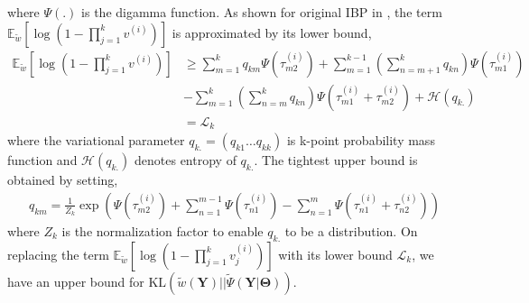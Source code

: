 \documentclass[runningheads]{llncs}
\begin{document}
where $\Psi(.)$ is the digamma function. As shown for original IBP in \cite{doshi2009variational}, the term $\mathbb{E}_{\tilde{w}}[\log(1 - \prod_{j=1}^k v^{(i)})]$ is approximated by its lower bound,
\begin{align}
\mathbb{E}_{\tilde{w}}[\log(1 - \prod_{j=1}^k v^{(i)})] &\geq \sum_{m=1}^k q_{km} \Psi(\tau_{m2}^{(i)}) + \sum_{m=1}^{k-1}\left(\sum_{n=m+1}^k q_{kn}\right)\Psi(\tau_{m1}^{(i)}) \nonumber \\
&- \sum_{m=1}^{k}\left(\sum_{n=m}^k q_{kn}\right)\Psi(\tau_{m1}^{(i)} + \tau_{m2}^{(i)}) + \mathcal{H}(q_{k.}) \label{ref2} \\
&= \mathcal{L}_k \nonumber
\end{align}
where the variational parameter $q_{k.} = (q_{k1}\dots q_{kk})$ is k-point probability mass function and $\mathcal{H}(q_{k.})$ denotes entropy of $q_{k.}$. The tightest upper bound is obtained by setting,
\begin{align*}
q_{km} = \frac{1}{Z_k} \exp\left(\Psi(\tau_{m2}^{(i)}) + \sum_{n=1}^{m-1}\Psi(\tau_{n1}^{(i)}) - \sum_{n=1}^m\Psi(\tau_{n1}^{(i)} + \tau_{n2}^{(i)})\right)
\end{align*} 
where $Z_k$ is the normalization factor to enable $q_{k.}$ to be a distribution. On replacing the term $\mathbb{E}_{\tilde{w}}[\log(1 - \prod_{j=1}^k v_j^{(i)})]$ with its lower bound $\mathcal{L}_k$, we have an upper bound for $\text{KL}\left(\tilde{w}(\mathbf{Y}) || \tilde{\Psi}(\mathbf{Y}|\mathbf{\Theta})\right)$.
\end{document}
